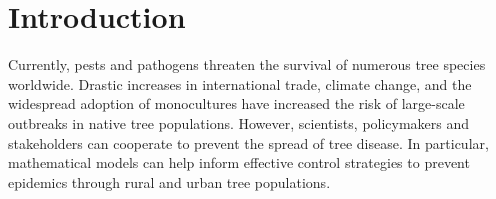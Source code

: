 
\chapter{Introduction}


Currently, pests and pathogens threaten the survival of numerous tree species worldwide. 
Drastic increases in international trade, climate change, and the widespread
adoption of monocultures have increased the risk of large-scale outbreaks in native tree populations. 
However, scientists, policymakers and stakeholders can cooperate to prevent the spread of tree disease. 
In particular, mathematical models can help inform effective control strategies to prevent epidemics through rural and urban tree populations. 

